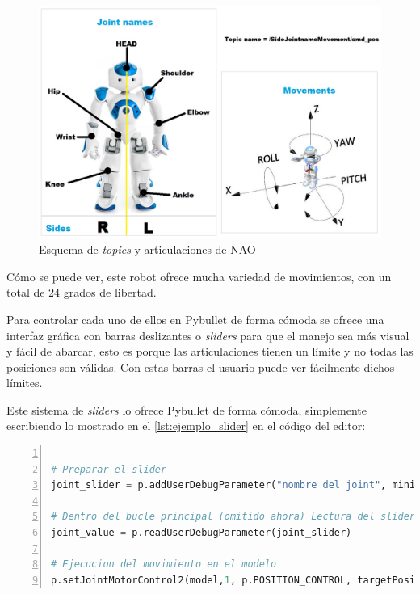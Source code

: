 \begin{figure}[H]
  \centering
  \includegraphics[width=1\textwidth]{figures/cap_4/esquema_joints_NAO.jpeg}
  \caption{Esquema de \textit{topics} y articulaciones de NAO}
  \label{fig:esquema_joints}
\end{figure}

Cómo se puede ver, este robot ofrece mucha variedad de movimientos, con un total de 24 grados de libertad.

Para controlar cada uno de ellos en Pybullet de forma cómoda se ofrece una interfaz gráfica con barras deslizantes o \textit{sliders} para que el manejo sea más visual y fácil de abarcar, esto es porque las articulaciones tienen un límite y no todas las posiciones son válidas. Con estas barras el usuario puede ver fácilmente dichos límites.

Este sistema de \textit{sliders} lo ofrece Pybullet de forma cómoda, simplemente escribiendo lo mostrado en el \autoref{lst:ejemplo_slider} en el código del editor:

\begin{lstlisting}[language=Python, caption={Ejemplo de adicición de sliders al editor}, label={lst:ejemplo_slider}, numbers=left, 
backgroundcolor=\color{gray!10}]    

# Preparar el slider
joint_slider = p.addUserDebugParameter("nombre del joint", minimo, maximo, posicion inicial)

# Dentro del bucle principal (omitido ahora) Lectura del slider
joint_value = p.readUserDebugParameter(joint_slider)

# Ejecucion del movimiento en el modelo
p.setJointMotorControl2(model,1, p.POSITION_CONTROL, targetPosition=joint_value, maxVelocity=2)
\end{lstlisting}


